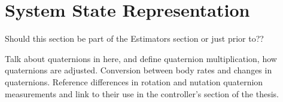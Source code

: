 
\chapter{System State Representation}
\label{chap:SystemStateRepresentation}

Should this section be part of the Estimators section or just prior to??

Talk about quaternions in here, and define quaternion multiplication, how quaternions are adjusted.  Conversion between body rates and changes in quaternions.  Reference differences in rotation and nutation quaternion measurements and link to their use in the controller's section of the thesis.
